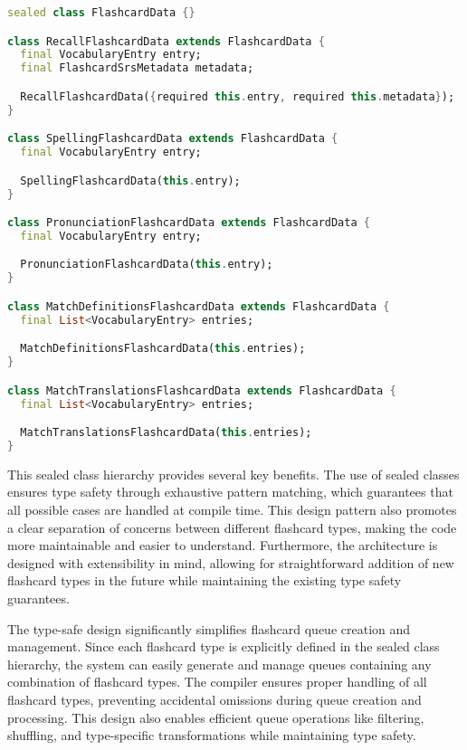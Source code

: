 \begin{lstlisting}[language=Dart, caption={FlashcardData sealed class hierarchy defining different flashcard types}, label=lst:flashcard-data]
sealed class FlashcardData {}

class RecallFlashcardData extends FlashcardData {
  final VocabularyEntry entry;
  final FlashcardSrsMetadata metadata;

  RecallFlashcardData({required this.entry, required this.metadata});
}

class SpellingFlashcardData extends FlashcardData {
  final VocabularyEntry entry;

  SpellingFlashcardData(this.entry);
}

class PronunciationFlashcardData extends FlashcardData {
  final VocabularyEntry entry;

  PronunciationFlashcardData(this.entry);
}

class MatchDefinitionsFlashcardData extends FlashcardData {
  final List<VocabularyEntry> entries;

  MatchDefinitionsFlashcardData(this.entries);
}

class MatchTranslationsFlashcardData extends FlashcardData {
  final List<VocabularyEntry> entries;

  MatchTranslationsFlashcardData(this.entries);
}
\end{lstlisting}

This sealed class hierarchy provides several key benefits. The use of sealed classes ensures type safety through exhaustive pattern matching, which guarantees that all possible cases are handled at compile time. This design pattern also promotes a clear separation of concerns between different flashcard types, making the code more maintainable and easier to understand. Furthermore, the architecture is designed with extensibility in mind, allowing for straightforward addition of new flashcard types in the future while maintaining the existing type safety guarantees.

The type-safe design significantly simplifies flashcard queue creation and management. Since each flashcard type is explicitly defined in the sealed class hierarchy, the system can easily generate and manage queues containing any combination of flashcard types. The compiler ensures proper handling of all flashcard types, preventing accidental omissions during queue creation and processing. This design also enables efficient queue operations like filtering, shuffling, and type-specific transformations while maintaining type safety.

